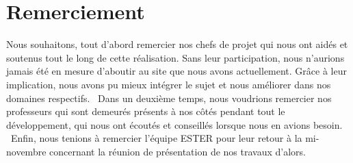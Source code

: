 \chapter*{Remerciement}

Nous souhaitons, tout d'abord remercier nos chefs de projet qui nous ont aidés et soutenus tout le long de cette réalisation. Sans leur participation, nous n'aurions jamais été en mesure d'aboutir au site que nous avons actuellement. Grâce à leur implication, nous avons pu mieux intégrer le sujet et nous améliorer dans nos domaines respectifs. \
Dans un deuxième temps, nous voudrions remercier nos professeurs qui sont demeurés présents à nos côtés pendant tout le développement, qui nous ont écoutés et conseillés lorsque nous en avions besoin. \
Enfin, nous tenions à remercier l'équipe ESTER pour leur retour à la mi-novembre concernant la réunion de présentation de nos travaux d'alors. 